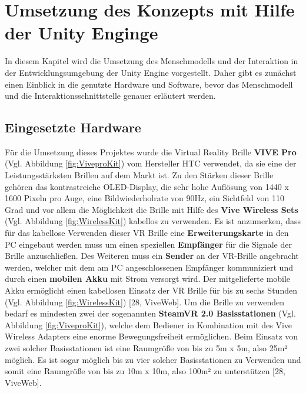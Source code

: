 \chapter{Umsetzung des Konzepts mit Hilfe der Unity Enginge}\label{cha:Umsetzung}
In diesem Kapitel wird die Umsetzung des Menschmodells und der Interaktion in der Entwicklungsumgebung der Unity Engine vorgestellt. Daher gibt es zunächst einen Einblick in die genutzte Hardware und Software, bevor das Menschmodell und die Interaktionsschnittstelle genauer erläutert werden.
\section{Eingesetzte Hardware}\label{sec:Hardware}
Für die Umsetzung dieses Projektes wurde die Virtual Reality Brille \textbf{VIVE Pro} (Vgl. Abbildung \ref{fig:ViveproKit}) vom Hersteller HTC verwendet, da sie eine der Leistungsstärksten Brillen auf dem Markt ist. Zu den Stärken dieser Brille gehören das kontrastreiche OLED-Display, die sehr hohe Auflösung von 1440 x 1600 Pixeln pro Auge, eine Bildwiederholrate von 90Hz, ein Sichtfeld von 110 Grad und vor allem die Möglichkeit die Brille mit Hilfe des \textbf{Vive Wireless Sets} (Vgl. Abbildung \ref{fig:WirelessKit}) kabellos zu verwenden. Es ist anzumerken, dass für das kabellose Verwenden dieser VR Brille eine \textbf{Erweiterungskarte} in den PC eingebaut werden muss um einen speziellen \textbf{Empfänger} für die Signale der Brille anzuschließen. Des Weiteren muss ein \textbf{Sender} an der VR-Brille angebracht werden, welcher mit dem am PC angeschlossenen Empfänger kommuniziert und durch einen \textbf{mobilen Akku} mit Strom versorgt wird. Der mitgelieferte mobile Akku ermöglicht einen kabellosen Einsatz der VR Brille für bis zu sechs Stunden (Vgl. Abbildung \ref{fig:WirelessKit}) [28, ViveWeb].
\newline\newline
Um die Brille zu verwenden bedarf es mindesten zwei der sogenannten \textbf{SteamVR 2.0 Basisstationen} (Vgl. Abbildung \ref{fig:ViveproKit}), welche dem Bediener in Kombination mit des Vive Wireless Adapters eine enorme Bewegungsfreiheit ermöglichen. Beim Einsatz von zwei solcher Basisstationen ist eine Raumgröße von bis zu 5m x 5m, also 25m² möglich. Es ist sogar möglich bis zu vier solcher Basisstationen zu Verwenden und somit eine Raumgröße von bis zu 10m x 10m, also 100m² zu unterstützen [28, ViveWeb].
